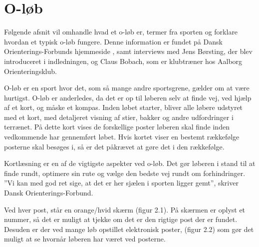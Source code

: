 \section{O-løb}
Følgende afsnit vil omhandle hvad et o-løb er, termer fra sporten og forklare hvordan et typisk o-løb fungere. Denne information er fundet på Dansk Orienterings-Forbunds hjemmeside \citep{DOF}, samt interviews med Jens Børsting, der blev introduceret i indledningen, og Claus Bobach, som er klubtræner hos Aalborg Orienteringsklub.

O-løb er en sport hvor det, som så mange andre sportsgrene, gælder om at være hurtigst. O-løb er anderledes, da det er op til løberen selv at finde vej, ved hjælp af et kort, og måske et kompas. Inden løbet starter, bliver alle løbere udstyret med et kort, med detaljeret visning af stier, bakker og andre udfordringer i terrænet. På dette kort vises de forskellige poster løberen skal finde inden vedkommende har gennemført løbet. Hvis kortet viser en bestemt rækkefølge posterne skal besøges i, så er det påkrævet at gøre det i den rækkefølge. 

Kortlæsning er en af de vigtigste aspekter ved o-løb. Det gør løberen i stand til at finde rundt, optimere sin rute og vælge den bedste vej rundt om forhindringer. ”Vi kan med god ret sige, at det er her sjælen i sporten ligger gemt”, skriver Dansk Orienterings-Forbund.   

Ved hver post, står en orange/hvid skærm (figur 2.1). På skærmen er oplyst et nummer, så det er muligt at tjekke om det er den rigtige post der er fundet. Desuden er der ved mange løb opstillet elektronisk poster, (figur 2.2) som gør det muligt at se hvornår løberen har været ved posterne.


